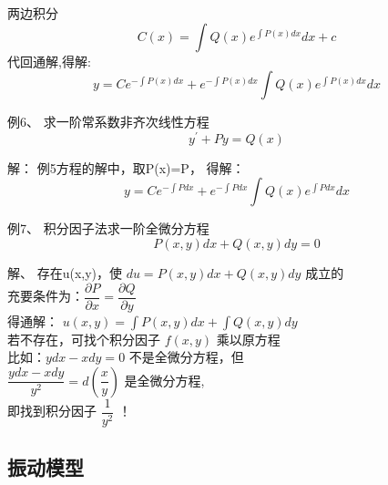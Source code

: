 \begin{frame}	
		两边积分
		\begin{equation*}
			C(x)=\int Q(x)e^{\int P(x)dx} dx+c 
		\end{equation*}	
		代回通解,得解:
		\begin{equation*}
			y=Ce^{-\int P(x)dx}+e^{-\int P(x)dx}\int Q(x)e^{\int P(x)dx} dx
		\end{equation*}	
\end{frame}

\begin{frame}
	\begin{exampleblock} {例6、	求一阶常系数非齐次线性方程}
	\begin{equation*}
		y^{\prime}+Py=Q(x)
	\end{equation*}
	\end{exampleblock} 
	\alert{解：} 例5方程的解中，取P(x)=P， 得解：
	\begin{equation*}
		y=Ce^{-\int Pdx}+e^{-\int Pdx}\int Q(x)e^{\int Pdx} dx
	\end{equation*}	
\end{frame}

\begin{frame}
	\begin{exampleblock} {例7、	积分因子法求一阶全微分方程}
	\begin{equation*}
	P(x,y)dx+Q(x,y)dy=0
	\end{equation*}
	\end{exampleblock} 
	\alert{解、}  存在u(x,y)，使 $ du=P(x,y)dx+Q(x,y)dy $ 成立的\\
    充要条件为：{$\dfrac{\partial P }{\partial x}=\dfrac{\partial Q }{\partial y}$ }\\	
	得通解：	{  $\displaystyle { u(x,y)=\int P(x,y)dx+\int Q(x,y)dy} $}\\ 
	若不存在，可找个积分因子 $f(x,y) $ 乘以原方程 \\  \vspace{0.2cm}
	比如：{\large    $ydx-xdy=0$ } 不是全微分方程，但\\ \vspace{0.2cm}
	$\dfrac{ydx-xdy}{y^2}=d(\dfrac{x}{y})$ 是全微分方程, \\ \vspace{0.2cm}
	即找到积分因子{  $ \dfrac{1}{y^2}$ } ！
\end{frame}

\subsection{振动模型}

